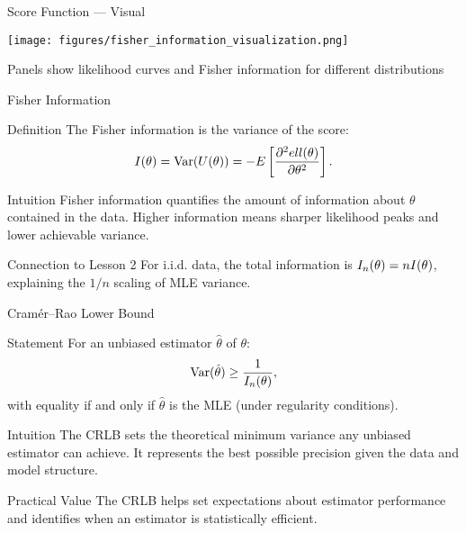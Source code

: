 \begin{frame}{Score Function --- Visual}
  \begin{center}
    \texttt{[image: figures/fisher\_information\_visualization.png]}
  \end{center}
  \vspace{-0.3cm}
  \footnotesize Panels show likelihood curves and Fisher information for different distributions
\end{frame}

\begin{frame}{Fisher Information}
  \begin{block}{Definition}
    The Fisher information is the variance of the score:
    \[I(\theta) = \operatorname{Var}(U(\theta)) = -E\left[\frac{\partial^2 ell(\theta)}{\partial \theta^2}\right].\]
  \end{block}

  \begin{block}{Intuition}
    Fisher information quantifies the amount of information about $\theta$
    contained in the data. Higher information means sharper likelihood
    peaks and lower achievable variance.
  \end{block}

  \begin{block}{Connection to Lesson 2}
    For i.i.d. data, the total information is $I_n(\theta) = n I(\theta)$,
    explaining the $1/n$ scaling of MLE variance.
  \end{block}
\end{frame}

\begin{frame}{Cramér--Rao Lower Bound}
  \begin{block}{Statement}
    For an unbiased estimator $\hat{\theta}$ of $\theta$:
    \[\operatorname{Var}(\hat{\theta}) \geq \frac{1}{I_n(\theta)},\]
    with equality if and only if $\hat{\theta}$ is the MLE (under regularity conditions).
  \end{block}

  \begin{block}{Intuition}
    The CRLB sets the theoretical minimum variance any unbiased estimator
    can achieve. It represents the best possible precision given the data
    and model structure.
  \end{block}

  \begin{block}{Practical Value}
    The CRLB helps set expectations about estimator performance and
    identifies when an estimator is statistically efficient.
  \end{block}
\end{frame}

